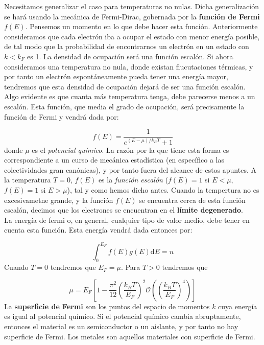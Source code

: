 \documentclass[12pt,a4paper]{book}
\numberwithin{equation}{section}
\numberwithin{figure}{section}
\newcommand{\parentesis}[1]{\left( #1  \right)}
\newcommand{\ccorchetes}[1]{\left[ #1  \right]}
\newcommand{\D}{\mathrm{d}}
\begin{document}
Necesitamos generalizar el caso para temperaturas no nulas. Dicha generalización se hará usando la mecánica de Fermi-Dirac, gobernada por la \textbf{función de Fermi} $f(E)$. Pensemos un momento en lo que debe hacer esta función. Anteriormente consideramos que cada electrón iba a ocupar el estado con menor energía posible, de tal modo que la probabilidad de encontrarnos un electrón en un estado con $k<k_F$ es 1. La densidad de ocupación será una función escalón. Si ahora consideramos una temperatura no nula, donde existan flucutaciones térmicas, y por tanto un electrón espontáneamente pueda tener una energía mayor, tendremos que esta densidad de ocupación dejará de ser una función escalón. Algo evidente es que cuanta más temperatura tenga, debe parecerse menos a un escalón. Esta función, que media el grado de ocupación, será precisamente la función de Fermi y vendrá dada por:

\begin{equation}
    f(E) = \frac{1}{e^{(E-\mu)/k_B T}+1}
\end{equation}
donde $\mu$ es el \textit{potencial químico}. La razón por la que tiene esta forma es correspondiente a un curso de mecánica estadística (en específico a las colectividades gran canónicas), y por tanto fuera del alcance de estos apuntes. A la temperatura $T=0$, $f(E)$ es la \textit{función escalón} ($f(E)=1$ si $E<\mu$, $f(E)=1$ si $E>\mu$), tal y como hemos dicho antes. Cuando la tempertura no es excesivametne grande, y la función $f(E)$ se encuentra cerca de esta función escalón, decimos que los electrones se encuentran en el \textbf{límite degenerado}. \\

La energía de fermi o, en general, cualquier tipo de valor medio, debe tener en cuenta esta función. Esta energía vendrá dada entonces por:

\begin{equation}
    \int_0^{E_F} f(E) g(E) \D E = n
\end{equation}
Cuando $T=0$ tendremos que $E_F = \mu$. Para $T>0$ tendremos que

\begin{equation}
    \mu = E_F \ccorchetes{1-\frac{\pi^2}{12} \parentesis{\frac{k_B T}{E_F}}^2 
     \mathcal{O}\parentesis{\parentesis{\frac{k_BT}{E_F}}^4} }
\end{equation}
La \textbf{superficie de Fermi} son los puntos del espacio de momentos $k$ cuya energía es igual al potencial químico. Si el potencial químico cambia abruptamente, entonces el material es un semiconductor o un aislante, y por tanto no hay superficie de Fermi. Los metales son aquellos materiales con superficie de Fermi.
\end{document}
